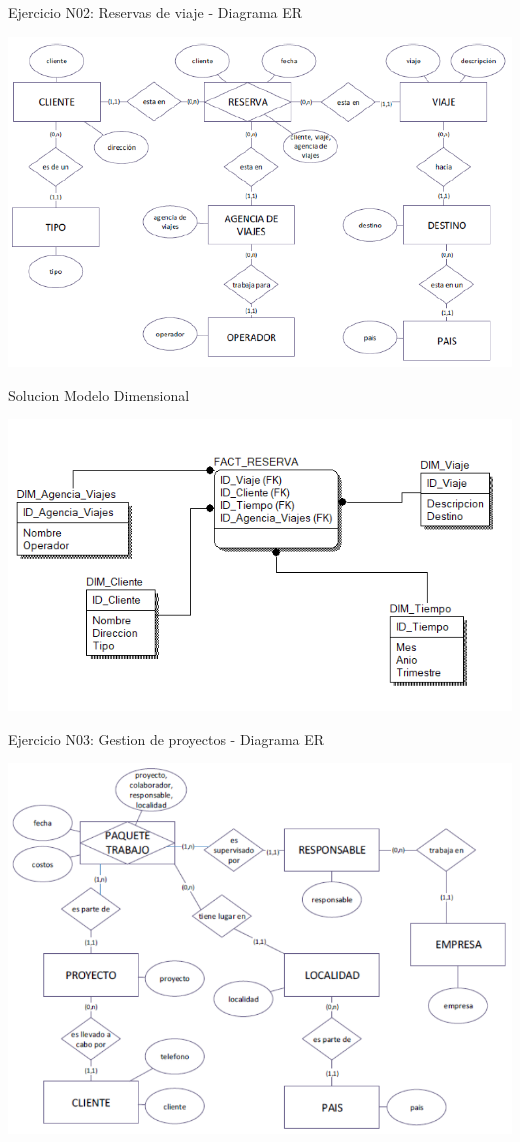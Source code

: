\documentclass[12pt,letterpaper]{article}
\begin{document}
Ejercicio N02:  Reservas de viaje - Diagrama ER

\begin{center}
\includegraphics[width=17cm]{IMG/er2.png} 
\end{center}

Solucion
Modelo Dimensional
\begin{center}
\includegraphics[width=17cm]{IMG/ejer2.png} 
\end{center}
 \newpage


Ejercicio N03:  Gestion de proyectos - Diagrama ER

\begin{center}
\includegraphics[width=17cm]{IMG/er3.png} 
\end{center}
\end{document}

